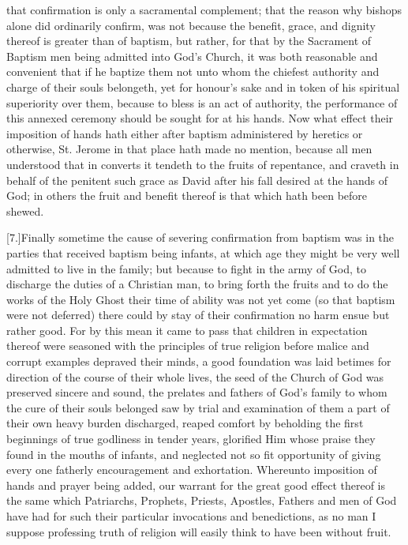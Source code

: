  that confirmation is only a sacramental complement; that the reason why bishops alone did ordinarily confirm, was not because the benefit, grace, and dignity thereof is greater than of baptism, but rather, for that by the Sacrament of Baptism men being admitted into God’s Church, it was both reasonable and convenient that if he baptize them not unto whom the chiefest authority and charge of their souls belongeth, yet for honour’s sake and in token of his spiritual superiority over them, because to bless is an act of authority, the performance of this annexed ceremony should be sought for at his hands. Now what effect their imposition of hands hath either after baptism administered by heretics or otherwise, St. Jerome in that place hath made no mention, because all men understood that in converts it tendeth to the fruits of repentance, and craveth in behalf of the penitent such grace as David after his fall desired at the hands of God; in others the fruit and benefit thereof is that which hath been before shewed.

[7.]Finally sometime the cause of severing confirmation from baptism was in the parties that received baptism being infants, at which age they might be very well admitted to live in the family; but because to fight in the army of God, to discharge the duties of a Christian man, to bring forth the fruits and to do the works of the Holy Ghost their time of ability was not yet come (so that baptism were not deferred) there could by stay of their confirmation no harm ensue but rather good. For by this mean it came to pass that children in expectation thereof were seasoned with the principles of true religion before malice and corrupt examples depraved  their minds,
 a good foundation was laid betimes for direction of the course of their whole lives, the seed of the Church of God was preserved sincere and sound, the prelates and fathers of God’s family to whom the cure of their souls belonged saw by trial and examination of them a part of their own heavy burden discharged, reaped comfort by beholding the first beginnings of true godliness in tender years, glorified Him whose praise they found in the mouths of infants, and neglected not so fit opportunity of giving every one fatherly encouragement and exhortation. Whereunto imposition of hands and prayer being added, our warrant for the great good effect thereof is the same which Patriarchs, Prophets, Priests, Apostles, Fathers and men of God have had for such their particular invocations and benedictions, as no man I suppose professing truth of religion will easily think to have been without fruit.

